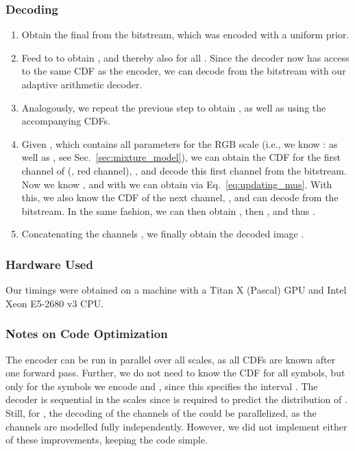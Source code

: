 \documentclass[10pt,twocolumn,letterpaper]{article}
\begin{document}
{\subsubsection*{Decoding}
\begin{enumerate}[leftmargin=*]
    \item Obtain the final  from the bitstream, which was encoded with a uniform prior.
    \item Feed  to  to obtain , and thereby also  for all . Since the decoder now has access to the same CDF as the encoder, we can decode  from the bitstream with our adaptive arithmetic decoder.
    \item Analogously, we repeat the previous step to obtain , as well as  using the accompanying CDFs.
    \item Given , which contains all parameters for the RGB scale (i.e., we know :  as well as , see Sec.~\ref{sec:mixture_model}), we can obtain the CDF for the first channel of  (, red channel), , and decode this first channel from the bitstream. Now we know , and with  we can obtain  via Eq.~\eqref{eq:updating_mus}. With this, we also know the CDF of the next channel, , and can decode  from the bitstream. In the same fashion, we can then obtain , then , and thus .
    \item Concatenating the channels , we finally obtain the decoded image .
\end{enumerate}

\subsubsection{Hardware Used}

Our timings were obtained on a machine with a Titan X (Pascal) GPU and Intel Xeon E5-2680 v3 CPU.


\subsubsection{Notes on Code Optimization} \label{sec:notes_optim}

The encoder can be run in parallel over all scales, as all CDFs are known after one forward pass. Further, we do not need to know the CDF for all symbols, but only for the symbols  we encode and , since this specifies the interval . 
The decoder is sequential in the scales since  is required to predict the distribution of . Still, for , the decoding of the channels of the  could be parallelized, as the channels are modelled fully independently.
However, we did not implement either of these improvements, keeping the code simple.

}
\end{document}

